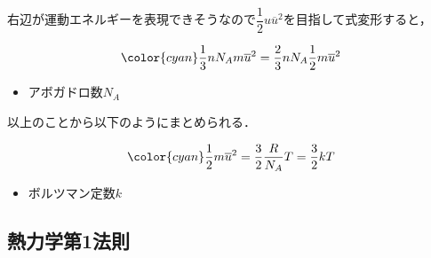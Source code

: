 \documentclass[a4paper,11pt]{ltjsarticle}
\begin{document}
右辺が運動エネルギーを表現できそうなので$\dfrac{1}{2}u \overline{u}^2$を目指して式変形すると，

\begin{equation*}
    {\color{cyan} \dfrac{1}{3} nN_A m \overline{u}^2 = \dfrac{2}{3} nN_A \dfrac{1}{2} m \overline{u}^2}
\end{equation*}

\begin{itemize}
    \item アボガドロ数$N_A$
\end{itemize}

以上のことから以下のようにまとめられる．

\begin{equation*}
    {\color{cyan} \dfrac{1}{2} m \overline{u}^2 = \dfrac{3}{2} \dfrac{R}{N_A}T =\dfrac{3}{2}kT}
\end{equation*}

\begin{itemize}
    \item ボルツマン定数$k$
\end{itemize}

\subsection{熱力学第1法則}
\end{document}

